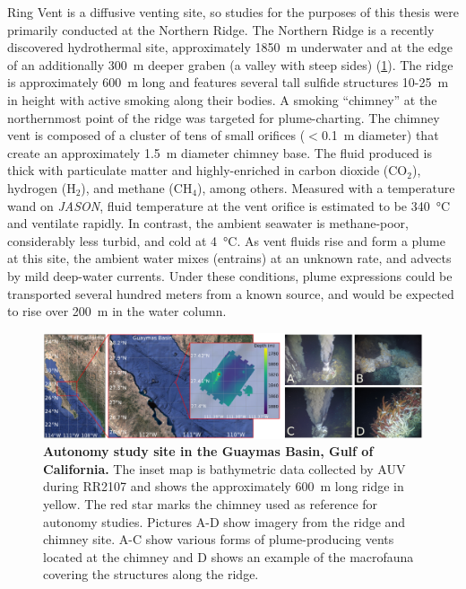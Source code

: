 Ring Vent is a diffusive venting site\autocite{teske2019characteristics}, so \Sentry studies for the purposes of this thesis were primarily conducted at the Northern Ridge. The Northern Ridge is a recently discovered hydrothermal site\autocite{soule2018exploration, geilert2018formation}, approximately \SI{1850}{\meter} underwater and at the edge of an additionally \SI{300}{\meter} deeper graben (a valley with steep sides) (\cref{fig:site}). The ridge is approximately \SI{600}{\meter} long and features several tall sulfide structures 10-\SI{25}{\meter} in height with active smoking along their bodies. A smoking ``chimney'' at the northernmost point of the ridge was targeted for plume-charting. The chimney vent is composed of a cluster of tens of small orifices ($<$\SI{0.1}{\meter} diameter) that create an approximately \SI{1.5}{\meter} diameter chimney base. The fluid produced is thick with particulate matter and highly-enriched in carbon dioxide (CO$_2$), hydrogen (H$_2$), and methane (CH$_4$), among others. Measured with a temperature wand on \emph{JASON}, fluid temperature at the vent orifice is estimated to be \SI{340}{\celsius} and ventilate rapidly. In contrast, the ambient seawater is methane-poor, considerably less turbid, and cold at \SI{4}{\celsius}. As vent fluids rise and form a plume at this site, the ambient water mixes (entrains) at an unknown rate, and advects by mild deep-water currents. Under these conditions, plume expressions could be transported several hundred meters from a known source, and would be expected to rise over \SI{200}{\meter} in the water column\autocite{speer1989model}.


\begin{figure}[!ht]
    \centering
    \includegraphics[width=\columnwidth]{figures/site_summary.png}
    \caption[Autonomy study site in the Guaymas Basin, Gulf of California.]{\textbf{Autonomy study site in the Guaymas Basin, Gulf of California.} The inset map is bathymetric data collected by AUV \Sentry during RR2107 and shows the approximately \SI{600}{\meter} long ridge in yellow. The red star marks the chimney used as reference for autonomy studies. Pictures A-D show imagery from the ridge and chimney site. A-C show various forms of plume-producing vents located at the chimney and D shows an example of the macrofauna covering the structures along the ridge.}
    \label{fig:site}
\end{figure}
 

